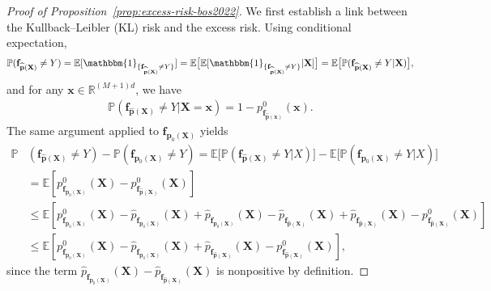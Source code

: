 \documentclass{article}
\theoremstyle{plain}
\theoremstyle{definition}
\theoremstyle{remark}
\newcommand{\R}{\mathbb{R}}
\newcommand{\PP}{\mathbb{P}}
\newcommand{\EE}{\mathbb{E}}
\begin{document}
\begin{proof}[Proof of Proposition~\ref{prop:excess-risk-bos2022}]
We first establish a link between the Kullback--Leibler (KL) risk and the excess risk. Using conditional expectation,
\begin{align}
     \PP (\mathbf{f}_{\widehat{\mathbf{p}}(\mathbf{X})}\neq Y)=\EE[\mathbbm{1}_{\{\mathbf{f}_{\widehat{\mathbf{p}}(\mathbf{X})}\neq Y\}}]=\EE\big[\EE[\mathbbm{1}_{\{\mathbf{f}_{\widehat{\mathbf{p}}(\mathbf{X})}\neq Y\}}|\mathbf{X}]\big]=\EE\big[\PP(\mathbf{f}_{\widehat{\mathbf{p}}(\mathbf{X})}\neq Y|\mathbf{X})\big],\nonumber
\end{align}
and for any $\mathbf{x}\in\R^{(M+1)d}$, we have 
\begin{align}
    \PP(\mathbf{f}_{\widehat{\mathbf{p}}(\mathbf{X})}\neq Y|\mathbf{X}=\mathbf{x})=1-p^0_{\mathbf{f}_{\widehat{\mathbf{p}}(\mathbf{x})}}(\mathbf{x}). \nonumber%
\end{align}
The same argument applied to \(\mathbf{f}_{\mathbf{p}_0(\mathbf{X})}\) yields
\begin{align}
\PP &(\mathbf{f}_{\widehat{\mathbf{p}}(\mathbf{X})}\neq Y)-\PP (\mathbf{f}_{\mathbf{p}_0(\mathbf{X})}\neq Y)=\EE\big[\PP(\mathbf{f}_{\widehat{\mathbf{p}}(\mathbf{X})}\neq Y|X)\big]-\EE\big[\PP(\mathbf{f}_{{\mathbf{p}_0}(\mathbf{X})}\neq Y|X)\big]\nonumber\\
&= \EE [p^0_{\mathbf{f}_{{\mathbf{p}_0}(\mathbf{X})}}(\mathbf{X})-p^0_{\mathbf{f}_{\widehat{\mathbf{p}}(\mathbf{X})}}(\mathbf{X})]\nonumber\\
&\leq \EE [p^0_{\mathbf{f}_{{\mathbf{p}_0}(\mathbf{X})}}(\mathbf{X})- \widehat{p}_{\mathbf{f}_{{\mathbf{p}_0}(\mathbf{X})}}(\mathbf{X}) +\widehat{p}_{\mathbf{f}_{{\mathbf{p}_0}(\mathbf{X})}}(\mathbf{X}) - \widehat{p}_{\mathbf{f}_{\widehat{{\mathbf{p}}}(\mathbf{X})}}(\mathbf{X}) + \widehat{p}_{\mathbf{f}_{\widehat{{\mathbf{p}}}(\mathbf{X})}}(\mathbf{X}) -p^0_{\mathbf{f}_{\widehat{\mathbf{p}}(\mathbf{X})}}(\mathbf{X})]\nonumber\\
&\leq \EE [p^0_{\mathbf{f}_{{\mathbf{p}_0}(\mathbf{X})}}(\mathbf{X})- \widehat{p}_{\mathbf{f}_{{\mathbf{p}_0}(\mathbf{X})}}(\mathbf{X})  + \widehat{p}_{\mathbf{f}_{\widehat{{\mathbf{p}}}(\mathbf{X})}}(\mathbf{X}) -p^0_{\mathbf{f}_{\widehat{\mathbf{p}}(\mathbf{X})}}(\mathbf{X})], \nonumber
\end{align}
since the term $\widehat{p}_{\mathbf{f}_{{\mathbf{p}_0}(\mathbf{X})}} (\mathbf{X})- \widehat{p}_{\mathbf{f}_{\widehat{{\mathbf{p}}}(\mathbf{X})}}(\mathbf{X})$ is nonpositive by definition. 

\end{proof}
\end{document}
